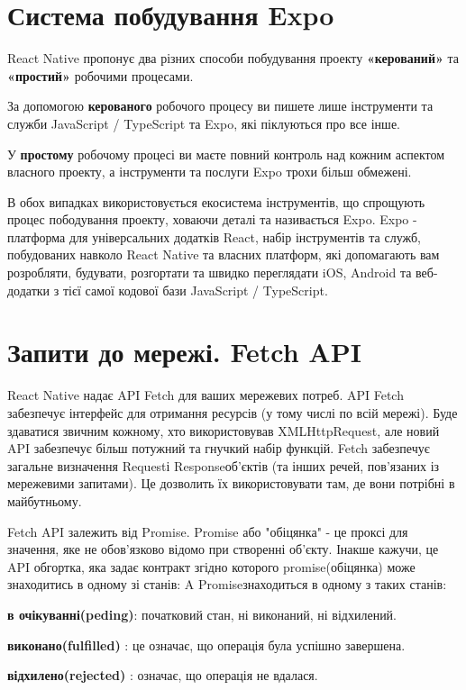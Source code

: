 \section{Система побудування Expo}
\label{section.2.4}
React Native пропонує два різних способи побудування проекту \textbf{«керований»} та \textbf{«простий»} робочими процесами.
\begin{itemize}
    \begin{item}
        За допомогою \textbf{керованого} робочого процесу ви пишете лише інструменти та служби JavaScript / TypeScript та Expo, які піклуються про все інше.
    \end{item}
    \begin{item}
        У \textbf{простому} робочому процесі ви маєте повний контроль над кожним аспектом власного проекту, а інструменти та послуги Expo трохи більш обмежені.
    \end{item}
\end{itemize}

В обох випадках використовується екосистема інструментів, що спрощують процес пободування проекту, ховаючи деталі та називається Expo.
Expo - платформа для універсальних додатків React, набір інструментів та служб, побудованих навколо React Native та власних платформ, які допомагають вам розробляти, будувати, розгортати та швидко переглядати iOS, Android та веб-додатки з тієї самої кодової бази JavaScript / TypeScript.\cite{expo_doc}


\section{Запити до мережі. Fetch API}
\label{section.2.5}
React Native надає API Fetch для ваших мережевих потреб.
API Fetch забезпечує інтерфейс для отримання ресурсів (у тому числі по всій мережі).
Буде здаватися звичним кожному, хто використовував XMLHttpRequest, але новий API забезпечує більш потужний та гнучкий набір функцій.
Fetch забезпечує загальне визначення Requestі Responseоб'єктів (та інших речей, пов'язаних із мережевими запитами).
Це дозволить їх використовувати там, де вони потрібні в майбутньому.

Fetch API залежить від Promise.
Promise або "обіцянка" - це проксі для значення, яке не обов'язково відомо при створенні об'єкту.\cite{promise_doc}
Інакше кажучи, це API обгортка, яка задає контракт згідно которого promise(обіцянка) може знаходитись в одному зі станів:
A Promiseзнаходиться в одному з таких станів:
\begin{itemize}
    \begin{item}
        \textbf{в очікуванні(peding)}: початковий стан, ні виконаний, ні відхилений.
    \end{item}
    \begin{item}
        \textbf{виконано(fulfilled)} : це означає, що операція була успішно завершена.
    \end{item}
    \begin{item}
        \textbf{відхилено(rejected)} : означає, що операція не вдалася.
    \end{item}
\end{itemize}

